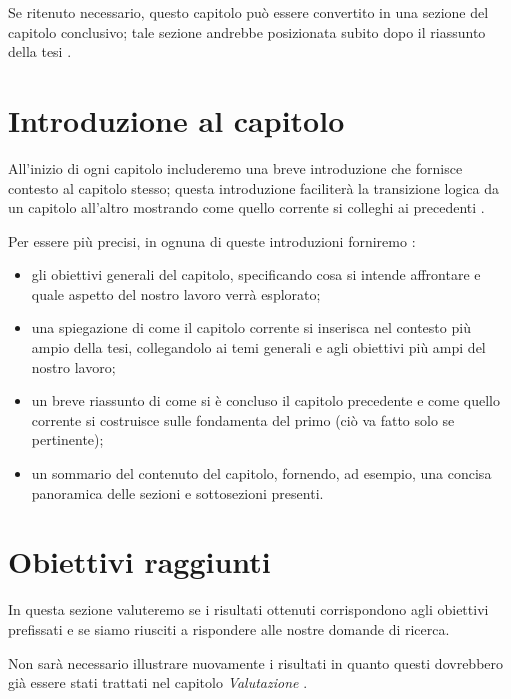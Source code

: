 \medskip

Se ritenuto necessario, questo capitolo può essere convertito in una sezione del capitolo conclusivo; tale sezione andrebbe posizionata subito dopo il riassunto della tesi \cite{zobel2015writing}.

\section{Introduzione al capitolo}

All'inizio di ogni capitolo includeremo una breve introduzione che fornisce contesto al capitolo stesso; questa introduzione faciliterà la transizione logica da un capitolo all'altro mostrando come quello corrente si colleghi ai precedenti \cite{zobel2015writing}.

\medskip

Per essere più precisi, in ognuna di queste introduzioni forniremo \cite{unibz2022thesis}:
\begin{itemize}

\item gli obiettivi generali del capitolo, specificando cosa si intende affrontare e quale aspetto del nostro lavoro verrà esplorato;

\item una spiegazione di come il capitolo corrente si inserisca nel contesto più ampio della tesi, collegandolo ai temi generali e agli obiettivi più ampi del nostro lavoro;

\item un breve riassunto di come si è concluso il capitolo precedente e come quello corrente si costruisce sulle fondamenta del primo (ciò va fatto solo se pertinente);

\item un sommario del contenuto del capitolo, fornendo, ad esempio, una concisa panoramica delle sezioni e sottosezioni presenti.

\end{itemize}

\section{Obiettivi raggiunti}

In questa sezione valuteremo se i risultati ottenuti corrispondono agli obiettivi prefissati e se siamo riusciti a rispondere alle nostre domande di ricerca. 

\medskip

Non sarà necessario illustrare nuovamente i risultati in quanto questi dovrebbero già essere stati trattati nel capitolo \textit{Valutazione} \cite{pfandzelter2022thesis}.

